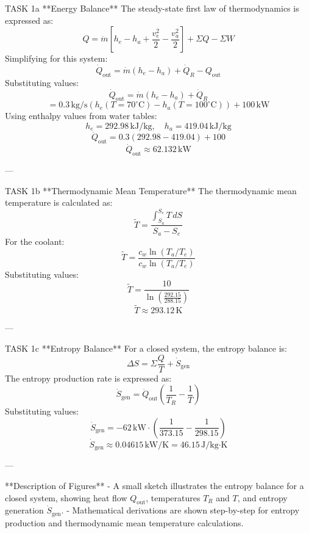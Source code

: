 TASK 1a  
**Energy Balance**  
The steady-state first law of thermodynamics is expressed as:  
\[
Q = \dot{m} \left[ h_e - h_a + \frac{v_e^2}{2} - \frac{v_a^2}{2} \right] + \Sigma Q - \Sigma W
\]  
Simplifying for this system:  
\[
\dot{Q}_{\text{out}} = \dot{m} \left( h_e - h_a \right) + \dot{Q}_R - Q_{\text{out}}
\]  
Substituting values:  
\[
\dot{Q}_{\text{out}} = \dot{m} \left( h_e - h_a \right) + \dot{Q}_R
\]  
\[
= 0.3 \, \text{kg/s} \left( h_e(T = 70^\circ\text{C}) - h_a(T = 100^\circ\text{C}) \right) + 100 \, \text{kW}
\]  
Using enthalpy values from water tables:  
\[
h_e = 292.98 \, \text{kJ/kg}, \quad h_a = 419.04 \, \text{kJ/kg}
\]  
\[
\dot{Q}_{\text{out}} = 0.3 \left( 292.98 - 419.04 \right) + 100
\]  
\[
\dot{Q}_{\text{out}} \approx 62.132 \, \text{kW}
\]  

---

TASK 1b  
**Thermodynamic Mean Temperature**  
The thermodynamic mean temperature is calculated as:  
\[
\tilde{T} = \frac{\int_{S_a}^{S_e} T \, dS}{S_a - S_e}
\]  
For the coolant:  
\[
\tilde{T} = \frac{c_w \ln \left( T_a / T_e \right)}{c_w \ln \left( T_a / T_e \right)}
\]  
Substituting values:  
\[
\tilde{T} = \frac{10}{\ln \left( \frac{292.15}{288.15} \right)}
\]  
\[
\tilde{T} \approx 293.12 \, \text{K}
\]  

---

TASK 1c  
**Entropy Balance**  
For a closed system, the entropy balance is:  
\[
\Delta S = \Sigma \frac{Q}{T} + \dot{S}_{\text{gen}}
\]  
The entropy production rate is expressed as:  
\[
\dot{S}_{\text{gen}} = \dot{Q}_{\text{out}} \left( \frac{1}{T_R} - \frac{1}{T} \right)
\]  
Substituting values:  
\[
\dot{S}_{\text{gen}} = -62 \, \text{kW} \cdot \left( \frac{1}{373.15} - \frac{1}{298.15} \right)
\]  
\[
\dot{S}_{\text{gen}} \approx 0.04615 \, \text{kW/K} = 46.15 \, \text{J/kg·K}
\]  

---

**Description of Figures**  
- A small sketch illustrates the entropy balance for a closed system, showing heat flow \( Q_{\text{out}} \), temperatures \( T_R \) and \( T \), and entropy generation \( \dot{S}_{\text{gen}} \).  
- Mathematical derivations are shown step-by-step for entropy production and thermodynamic mean temperature calculations.